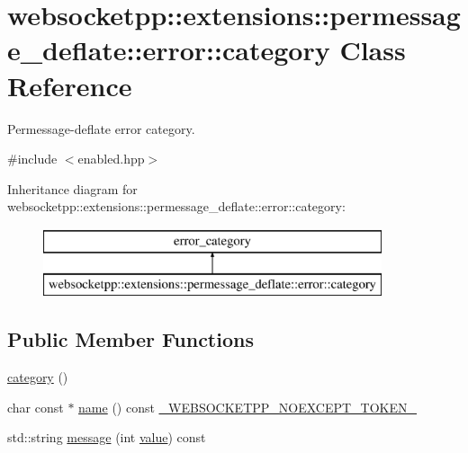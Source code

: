 \hypertarget{classwebsocketpp_1_1extensions_1_1permessage__deflate_1_1error_1_1category}{}\section{websocketpp\+:\+:extensions\+:\+:permessage\+\_\+deflate\+:\+:error\+:\+:category Class Reference}
\label{classwebsocketpp_1_1extensions_1_1permessage__deflate_1_1error_1_1category}


Permessage-\/deflate error category.  




{\ttfamily \#include $<$enabled.\+hpp$>$}

Inheritance diagram for websocketpp\+:\+:extensions\+:\+:permessage\+\_\+deflate\+:\+:error\+:\+:category\+:\begin{figure}[H]
\begin{center}
\leavevmode
\includegraphics[height=2.000000cm]{classwebsocketpp_1_1extensions_1_1permessage__deflate_1_1error_1_1category}
\end{center}
\end{figure}
\subsection*{Public Member Functions}
\begin{DoxyCompactItemize}
\item 
\hyperlink{classwebsocketpp_1_1extensions_1_1permessage__deflate_1_1error_1_1category_a9c0026b8e71ac960bbe48f58df71dac7}{category} ()
\item 
char const $\ast$ \hyperlink{classwebsocketpp_1_1extensions_1_1permessage__deflate_1_1error_1_1category_a042aa64aca0a9118cda65c25e8fbb83b}{name} () const \hyperlink{boost__config_8hpp_aa19747404a5f2fe9c9eb9e9d2e48f26c}{\+\_\+\+W\+E\+B\+S\+O\+C\+K\+E\+T\+P\+P\+\_\+\+N\+O\+E\+X\+C\+E\+P\+T\+\_\+\+T\+O\+K\+E\+N\+\_\+}
\item 
std\+::string \hyperlink{classwebsocketpp_1_1extensions_1_1permessage__deflate_1_1error_1_1category_a4649c76d17bebf65af4a817e768a61fd}{message} (int \hyperlink{namespacewebsocketpp_1_1extensions_1_1permessage__deflate_1_1error_a38e53d7586dd60059cc99a5833bbe54e}{value}) const 
\end{DoxyCompactItemize}


